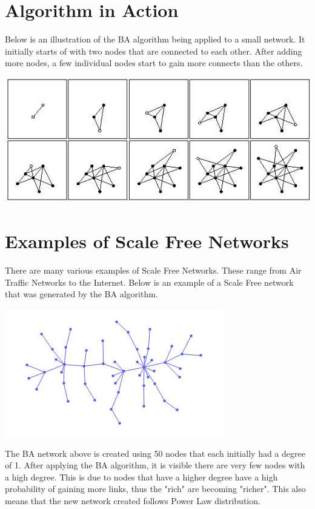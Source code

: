 \documentclass[a0,final]{a0poster}
\begin{document}
\begin{multicols}{3}
\section*{Algorithm in Action}
Below is an illustration of the BA algorithm being applied to a small network.
It initially starts of with two nodes that are connected to each other. After adding more nodes, a few individual nodes start to gain more connects than the others.
\centerline{\includegraphics{growth.jpg}}

\columnbreak

\section*{Examples of Scale Free Networks}

There are many various examples of Scale Free Networks. These range from Air Traffic Networks to the Internet. Below is an example of a Scale Free network that was generated by the BA algorithm.
\newline
{\centering
\centerline{\includegraphics[scale=1.5]{BA.jpg}}}
\newline
The BA network above is created using 50 nodes that each initially had a degree of 1.
After applying the BA algorithm, it is visible there are very few nodes with a high degree. This is due to nodes that have a higher degree have a high probability of gaining more links, thus the "rich" are becoming "richer". This also means that the new network created follows Power Law distribution.
\newline


\end{multicols}
\end{document}
